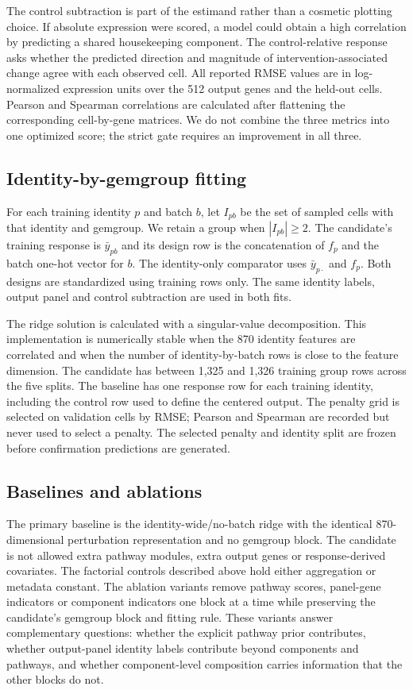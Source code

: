 \documentclass[10pt]{article}
\begin{document}
The control subtraction is part of the estimand rather than a cosmetic plotting choice. If absolute expression were scored, a model could obtain a high correlation by predicting a shared housekeeping component. The control-relative response asks whether the predicted direction and magnitude of intervention-associated change agree with each observed cell. All reported RMSE values are in log-normalized expression units over the 512 output genes and the held-out cells. Pearson and Spearman correlations are calculated after flattening the corresponding cell-by-gene matrices. We do not combine the three metrics into one optimized score; the strict gate requires an improvement in all three.

\subsection{Identity-by-gemgroup fitting}
For each training identity $p$ and batch $b$, let $I_{pb}$ be the set of sampled cells with that identity and gemgroup. We retain a group when $|I_{pb}|\ge 2$. The candidate's training response is $\bar{y}_{pb}$ and its design row is the concatenation of $f_p$ and the batch one-hot vector for $b$. The identity-only comparator uses $\bar{y}_{p\cdot}$ and $f_p$. Both designs are standardized using training rows only. The same identity labels, output panel and control subtraction are used in both fits.

The ridge solution is calculated with a singular-value decomposition. This implementation is numerically stable when the 870 identity features are correlated and when the number of identity-by-batch rows is close to the feature dimension. The candidate has between 1,325 and 1,326 training group rows across the five splits. The baseline has one response row for each training identity, including the control row used to define the centered output. The penalty grid is selected on validation cells by RMSE; Pearson and Spearman are recorded but never used to select a penalty. The selected penalty and identity split are frozen before confirmation predictions are generated.

\subsection{Baselines and ablations}
The primary baseline is the identity-wide/no-batch ridge with the identical 870-dimensional perturbation representation and no gemgroup block. The candidate is not allowed extra pathway modules, extra output genes or response-derived covariates. The factorial controls described above hold either aggregation or metadata constant. The ablation variants remove pathway scores, panel-gene indicators or component indicators one block at a time while preserving the candidate's gemgroup block and fitting rule. These variants answer complementary questions: whether the explicit pathway prior contributes, whether output-panel identity labels contribute beyond components and pathways, and whether component-level composition carries information that the other blocks do not.
\end{document}
